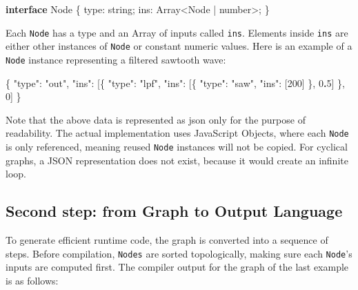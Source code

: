 \documentclass[11pt,]{article}
\newenvironment{Shaded}{}{}
\newcommand{\BuiltInTok}[1]{\textcolor[rgb]{0.00,0.50,0.00}{#1}}
\newcommand{\DataTypeTok}[1]{\textcolor[rgb]{0.56,0.13,0.00}{#1}}
\newcommand{\DecValTok}[1]{\textcolor[rgb]{0.25,0.63,0.44}{#1}}
\newcommand{\ErrorTok}[1]{\textcolor[rgb]{1.00,0.00,0.00}{\textbf{#1}}}
\newcommand{\FunctionTok}[1]{\textcolor[rgb]{0.02,0.16,0.49}{#1}}
\newcommand{\KeywordTok}[1]{\textcolor[rgb]{0.00,0.44,0.13}{\textbf{#1}}}
\newcommand{\NormalTok}[1]{#1}
\newcommand{\OperatorTok}[1]{\textcolor[rgb]{0.40,0.40,0.40}{#1}}
\newcommand{\OtherTok}[1]{\textcolor[rgb]{0.00,0.44,0.13}{#1}}
\newcommand{\StringTok}[1]{\textcolor[rgb]{0.25,0.44,0.63}{#1}}
\begin{document}
\begin{Shaded}
\begin{Highlighting}[]
\KeywordTok{interface} \BuiltInTok{Node}\NormalTok{ \{}
\NormalTok{  type}\OperatorTok{:} \DataTypeTok{string}\OperatorTok{;}
\NormalTok{  ins}\OperatorTok{:} \BuiltInTok{Array}\OperatorTok{\textless{}}\BuiltInTok{Node} \OperatorTok{|} \DataTypeTok{number}\OperatorTok{\textgreater{};}
\NormalTok{\}}
\end{Highlighting}
\end{Shaded}

Each \texttt{Node} has a type and an Array of inputs called
\texttt{ins}. Elements inside \texttt{ins} are either other instances of
\texttt{Node} or constant numeric values. Here is an example of a
\texttt{Node} instance representing a filtered sawtooth wave:

\begin{Shaded}
\begin{Highlighting}[]
\FunctionTok{\{}
  \DataTypeTok{"type"}\FunctionTok{:} \StringTok{"out"}\FunctionTok{,}
  \DataTypeTok{"ins"}\FunctionTok{:} \OtherTok{[}\FunctionTok{\{} \DataTypeTok{"type"}\FunctionTok{:} \StringTok{"lpf"}\FunctionTok{,} \DataTypeTok{"ins"}\FunctionTok{:} \OtherTok{[}\FunctionTok{\{} \DataTypeTok{"type"}\FunctionTok{:} \StringTok{"saw"}\FunctionTok{,} \DataTypeTok{"ins"}\FunctionTok{:} \OtherTok{[}\DecValTok{200}\OtherTok{]} \FunctionTok{\}}\OtherTok{,} \DecValTok{0}\ErrorTok{.}\DecValTok{5}\OtherTok{]} \FunctionTok{\}}\OtherTok{,} \DecValTok{0}\OtherTok{]}
\FunctionTok{\}}
\end{Highlighting}
\end{Shaded}

Note that the above data is represented as json only for the purpose of
readability. The actual implementation uses JavaScript Objects, where
each \texttt{Node} is only referenced, meaning reused \texttt{Node}
instances will not be copied. For cyclical graphs, a JSON representation
does not exist, because it would create an infinite loop.

\subsection{Second step: from Graph to Output
Language}\label{second-step-from-graph-to-output-language}

To generate efficient runtime code, the graph is converted into a
sequence of steps. Before compilation, \texttt{Nodes} are sorted
topologically, making sure each \texttt{Node}'s inputs are computed
first. The compiler output for the graph of the last example is as
follows:
\end{document}
